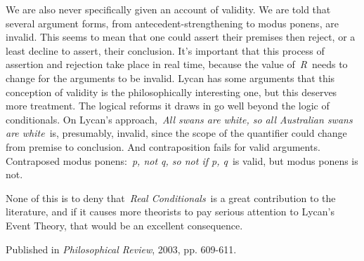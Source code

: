 \documentclass[
  11pt,
  letterpaper,
  DIV=11,
  numbers=noendperiod,
  twoside]{scrartcl}
\begin{document}
We are also never specifically given an account of validity. We are told
that several argument forms, from antecedent-strengthening to modus
ponens, are invalid. This seems to mean that one could assert their
premises then reject, or a least decline to assert, their conclusion.
It's important that this process of assertion and rejection take place
in real time, because the value of~\emph{R}~needs to change for the
arguments to be invalid. Lycan has some arguments that this conception
of validity is the philosophically interesting one, but this deserves
more treatment. The logical reforms it draws in go well beyond the logic
of conditionals. On Lycan's approach,~\emph{All swans are white, so all
Australian swans are white}~is, presumably, invalid, since the scope of
the quantifier could change from premise to conclusion. And
contraposition fails for valid arguments. Contraposed modus
ponens:~\emph{p, not q, so not if p, q}~is valid, but modus ponens is
not.

None of this is to deny that~\emph{Real Conditionals}~is a great
contribution to the literature, and if it causes more theorists to pay
serious attention to Lycan's Event Theory, that would be an excellent
consequence.

\vspace{1cm}



\noindent Published in\emph{
Philosophical Review}, 2003, pp. 609-611.
\end{document}
